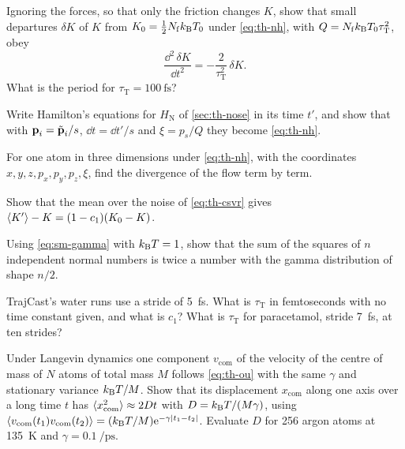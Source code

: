 \begin{exercise}
\label{ex:th-nh-swing}
Ignoring the forces, so that only the friction changes $K$, show that
small departures $\delta K$ of $K$ from $K_0 = \frac12N_{\mathrm f}k_{\mathrm{B}} T_0$
under \cref{eq:th-nh}, with $Q = N_{\mathrm f}k_{\mathrm{B}} T_0\tau_{\mathrm T}^2$,
obey
\begin{equation*}
   \frac{\dd^2\,\delta K}{\dd t^2} = -\frac{2}{\tau_{\mathrm T}^2}\,\delta K .
\end{equation*}
What is the period for $\tau_{\mathrm T} = \SI{100}{\femto\second}$?
\end{exercise}

\begin{exercise}
\label{ex:th-nose}
Write Hamilton's equations for $H_{\mathrm N}$ of \cref{sec:th-nose} in
its time $t'$, and show that with $\bm{\mathrm{p}}_i = \tilde{\bm{\mathrm{p}}}_i/s$, $\dd t
= \dd t'/s$ and $\xi = p_s/Q$ they become \cref{eq:th-nh}.
\end{exercise}

\begin{exercise}
\label{ex:th-divergence}
For one atom in three dimensions under \cref{eq:th-nh}, with the
coordinates $x, y, z, p_x, p_y, p_z, \xi$, find the divergence of the
flow term by term.
\end{exercise}

\begin{exercise}
\label{ex:th-csvr-mean}
Show that the mean over the noise of \cref{eq:th-csvr} gives $\langle K' \rangle -
K = (1 - c_1)(K_0 - K)$.
\end{exercise}

\begin{exercise}
\label{ex:th-chi}
Using \cref{eq:sm-gamma} with $k_{\mathrm{B}} T = 1$, show that the sum of the
squares of $n$ independent normal numbers is twice a number with the
gamma distribution of shape $n/2$.
\end{exercise}

\begin{exercise}
\label{ex:th-trajcast}
TrajCast's water runs use a stride of \SI{5}{\femto\second}. What is
$\tau_{\mathrm T}$ in femtoseconds with no time constant given, and what
is $c_1$? What is $\tau_{\mathrm T}$ for paracetamol, stride
\SI{7}{\femto\second}, at ten strides?
\end{exercise}

\begin{exercise}
\label{ex:th-com}
Under Langevin dynamics one component $v_{\mathrm{com}}$ of the velocity
of the centre of mass of $N$ atoms of total mass $M$ follows
\cref{eq:th-ou} with the same $\gamma$ and stationary variance $k_{\mathrm{B}} T/M$.
Show that its displacement $x_{\mathrm{com}}$ along one axis over a long
time $t$ has $\langle x_{\mathrm{com}}^2 \rangle \approx 2Dt$ with $D = k_{\mathrm{B}}
T/(M\gamma)$, using $\langle v_{\mathrm{com}}(t_1)v_{\mathrm{com}}(t_2) \rangle =
(k_{\mathrm{B}} T/M)\mathrm{e}^{-\gamma\lvert t_1 - t_2\rvert}$. Evaluate $D$ for 256 argon atoms at \SI{135}{\kelvin} and
$\gamma = \SI{0.1}{\per\pico\second}$.
\end{exercise}

